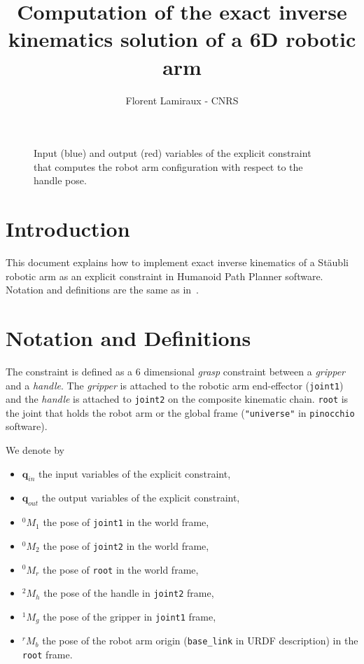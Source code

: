 \documentclass{article}
\title{Computation of the exact inverse kinematics solution of a 6D robotic arm}
\author{Florent Lamiraux - CNRS}
\newcommand\conf{\mathbf{q}}
\begin{document}
\maketitle

\begin{figure}
  \begin{center}
    \def\svgwidth {.6\linewidth}
    \graphicspath{{./figures/}}
    
  \end{center}
  \caption{Input (blue) and output (red) variables of the explicit constraint that computes the robot arm configuration with respect to the handle pose.}
  \label{fig:kinematic-chain}
\end{figure}

\section{Introduction}

This document explains how to implement exact inverse kinematics of a Stäubli robotic arm as an
explicit constraint in Humanoid Path Planner software. Notation and definitions are the same as
in~\cite{lamiraux:hal-02995125}.

\section{Notation and Definitions}

The constraint is defined as a 6 dimensional \textit{grasp} constraint between a \textit{gripper} and a
\textit{handle}. The \textit{gripper} is attached to the robotic arm end-effector (\texttt{joint1}) and the \textit{handle} is attached to \texttt{joint2} on the composite kinematic chain. \texttt{root} is the joint that holds the robot arm or the global frame (\texttt{"universe"} in \texttt{pinocchio} software).

We denote by
\begin{itemize}
\item $\conf_{in}$ the input variables of the explicit constraint,
\item $\conf_{out}$ the output variables of the explicit constraint,
\item $^0M_1$ the pose of \texttt{joint1} in the world frame,
\item $^0M_2$ the pose of \texttt{joint2} in the world frame,
\item $^0M_r$ the pose of \texttt{root} in the world frame,
\item $^2M_h$ the pose of the handle in \texttt{joint2} frame,
\item $^1M_g$ the pose of the gripper in \texttt{joint1} frame,
\item $^rM_b$ the pose of the robot arm origin (\texttt{base\_link} in URDF
  description) in the \texttt{root} frame.  
\end{itemize}
\end{document}
